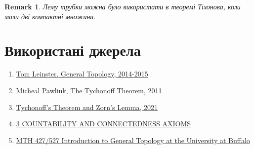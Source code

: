\documentclass[a4paper, 10pt]{article}
\theoremstyle{theoremdd}
\newtheorem{definition}[theorem]{Definition}
\newtheorem{remark}[theorem]{Remark}
\begin{document}
\begin{remark}
Лему трубки можна було використати в теоремі Тіхонова, коли мали дві компактні множини.
\end{remark}
\newpage

\section*{Використані джерела}
\begin{enumerate}
\item \href{https://www.maths.ed.ac.uk/~tl/topology/topology_notes.pdf}{Tom Leinster, General Topology, 2014-2015}
\item \href{https://www.math.toronto.edu/~herzig/Tychonoff-lecture.pdf}{Micheal Pawliuk, The Tychonoff Theorem, 2011}
\item \href{https://cronokirby.com/posts/2021/02/tychonoff-theorem-and-zorns-lemma/}{Tychonoff's Theorem and Zorn's Lemma, 2021}
\item \href{https://www.math.auckland.ac.nz/~gauld/750-05/section3.pdf}{3 COUNTABILITY AND CONNECTEDNESS AXIOMS}
\item \href{https://www.youtube.com/watch?v=6yusB-muawU&list=PLfKcn7LuYa_Kr3_aWePrYufu7MMYWYM5-&index=1&ab_channel=mth309}{MTH 427/527 Introduction to General Topology at the University at Buffalo}
\end{enumerate}

\iffalse
\begin{definition}
Задано $(X,\tau)$ -- топологічний простір.\\
Ми будемо це називати \textbf{гаусдорфовим простором}, якщо
\begin{align*}
\forall x,y \in X: x \neq y: \exists U_x,U_y \text{ -- відкриті околи точок } x,y: U_x \cap U_y = \emptyset
\end{align*}
\end{definition}
\fi
\end{document}
